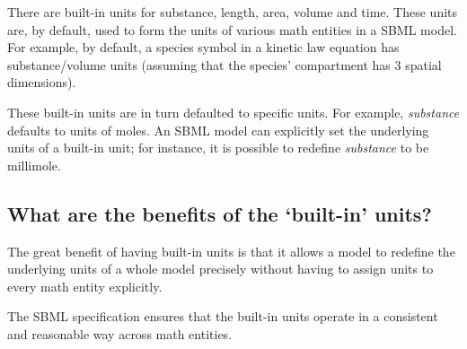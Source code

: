 \documentclass{sbmlfaq}
\begin{document}
There are built-in units for substance, length, area, volume and time.  These units
are, by default, used to form the units of various math entities in a SBML model.
For example, by default, a species symbol in a kinetic law equation has substance/volume 
units (assuming that the species' compartment has 3 spatial dimensions).

These built-in units are in turn defaulted to specific units.  For example,
\emph{substance} defaults to units of moles.  An SBML model can explicitly
set the underlying units of a built-in unit; for instance, it is possible
to redefine \emph{substance} to be millimole.


\subsection{What are the benefits of the `built-in' units?}

The great benefit of having built-in units is that it allows
a model to redefine the underlying units of a whole model
precisely without having to assign units to every math entity explicitly.

The SBML specification ensures that the built-in units operate in a consistent
and reasonable way across math entities.
\end{document}
